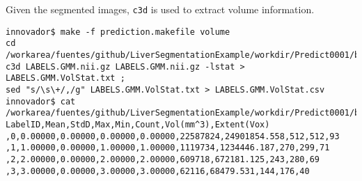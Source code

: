 \documentclass[10pt]{amsart}
\begin{document}
Given the segmented images, \verb#c3d# is used to extract volume
information. 
{\small
\begin{verbatim}
innovador$ make -f prediction.makefile volume
cd /workarea/fuentes/github/LiverSegmentationExample/workdir/Predict0001/before/FeatureModel00000130/KFold.0000000000000011111111111111111110.prior.GMM.RFModel;
c3d LABELS.GMM.nii.gz LABELS.GMM.nii.gz -lstat > LABELS.GMM.VolStat.txt ;
sed "s/\s\+/,/g" LABELS.GMM.VolStat.txt > LABELS.GMM.VolStat.csv
innovador$ cat
/workarea/fuentes/github/LiverSegmentationExample/workdir/Predict0001/before/FeatureModel00000130/KFold.0000000000000011111111111111111110.prior.GMM.RFModel/LABELS.GMM.VolStat.csv
LabelID,Mean,StdD,Max,Min,Count,Vol(mm^3),Extent(Vox)
,0,0.00000,0.00000,0.00000,0.00000,22587824,24901854.558,512,512,93
,1,1.00000,0.00000,1.00000,1.00000,1119734,1234446.187,270,299,71
,2,2.00000,0.00000,2.00000,2.00000,609718,672181.125,243,280,69
,3,3.00000,0.00000,3.00000,3.00000,62116,68479.531,144,176,40
\end{verbatim}
}
\end{document}
